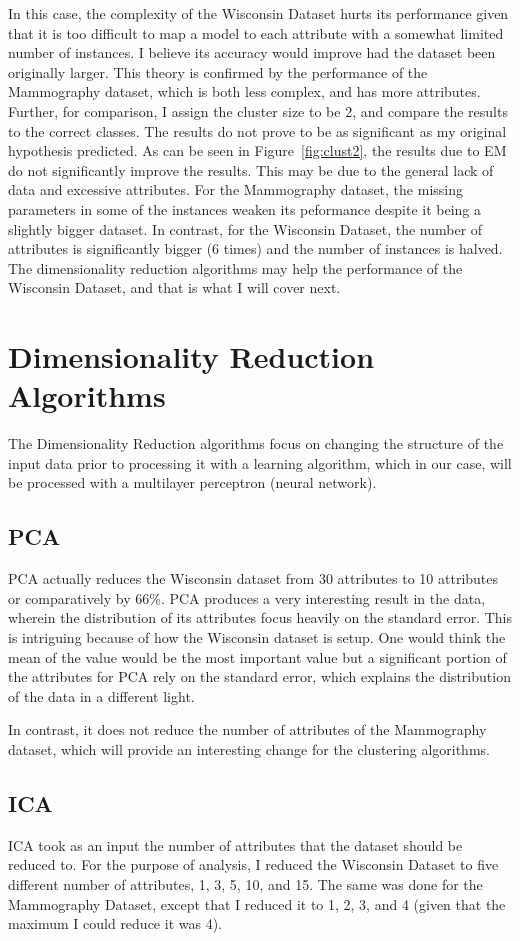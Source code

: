 \documentclass[annual]{acmsiggraph}
\begin{document}
In this case, the complexity of the Wisconsin Dataset hurts its performance given that it is too difficult to map a model to each attribute with a somewhat limited number of instances. I believe its accuracy would improve had the dataset been originally larger. This theory is confirmed by the performance of the Mammography dataset, which is both less complex, and has more attributes. Further, for comparison, I assign the cluster size to be 2, and compare the results to the correct classes. The results do not prove to be as significant as my original hypothesis predicted.
As can be seen in Figure~\ref{fig:clust2}, the results due to EM do not significantly improve the results. This may be due to the general lack of data and excessive attributes. For the Mammography dataset, the missing parameters in some of the instances weaken its peformance despite it being a slightly bigger dataset. In contrast, for the Wisconsin Dataset, the number of attributes is significantly bigger (6 times) and the number of instances is halved. The dimensionality reduction algorithms may help the performance of the Wisconsin Dataset, and that is what I will cover next.
\section{Dimensionality Reduction Algorithms}
The Dimensionality Reduction algorithms focus on changing the structure of the input data prior to processing it with a learning algorithm, which in our case, will be processed with a multilayer perceptron (neural network).
\subsection{PCA}
PCA actually reduces the Wisconsin dataset from 30 attributes to 10 attributes or comparatively by 66\%. PCA produces a very interesting result in the data, wherein the distribution of its attributes focus heavily on the standard error. This is intriguing because of how the Wisconsin dataset is setup. One would think the mean of the value would be the most important value but a significant portion of the attributes for PCA rely on the standard error, which explains the distribution of the data in a different light.

In contrast, it does not reduce the number of attributes of the Mammography dataset, which will provide an interesting change for the clustering algorithms. 
\subsection{ICA}
ICA took as an input the number of attributes that the dataset should be reduced to. For the purpose of analysis, I reduced the Wisconsin Dataset to five different number of attributes, 1, 3, 5, 10, and 15. The same was done for the Mammography Dataset, except that I reduced it to 1, 2, 3, and 4 (given that the maximum I could reduce it was 4).
\end{document}
